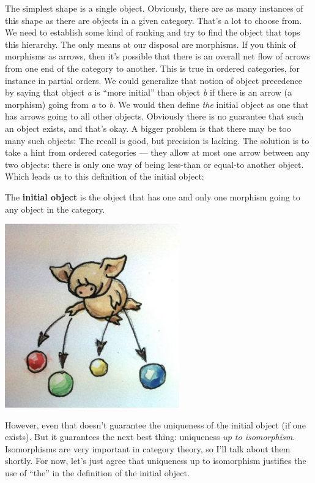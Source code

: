 The simplest shape is a single object. Obviously, there are as many
instances of this shape as there are objects in a given category. That's
a lot to choose from. We need to establish some kind of ranking and try
to find the object that tops this hierarchy. The only means at our
disposal are morphisms. If you think of morphisms as arrows, then it's
possible that there is an overall net flow of arrows from one end of the
category to another. This is true in ordered categories, for instance in
partial orders. We could generalize that notion of object precedence by
saying that object \emph{a} is ``more initial'' than object \emph{b} if
there is an arrow (a morphism) going from \emph{a} to \emph{b}. We would
then define \emph{the} initial object as one that has arrows going to
all other objects. Obviously there is no guarantee that such an object
exists, and that's okay. A bigger problem is that there may be too many
such objects: The recall is good, but precision is lacking. The solution
is to take a hint from ordered categories --- they allow at most one
arrow between any two objects: there is only one way of being less-than
or equal-to another object. Which leads us to this definition of the
initial object:

The \textbf{initial object} is the object that has one and only one
morphism going to any object in the category.

\includegraphics[width=2.96875in]{images/initial.jpg}

However, even that doesn't guarantee the uniqueness of the initial
object (if one exists). But it guarantees the next best thing:
uniqueness \emph{up to isomorphism}. Isomorphisms are very important in
category theory, so I'll talk about them shortly. For now, let's just
agree that uniqueness up to isomorphism justifies the use of ``the'' in
the definition of the initial object.

